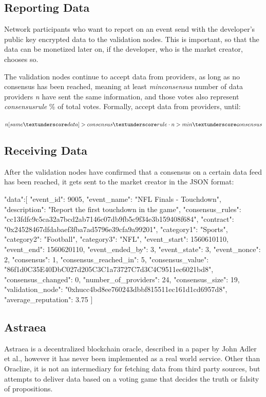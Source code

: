 \subsection*{Reporting Data}
Network participants who want to report on an event send with the developer's public key encrypted data to the validation nodes. This is important, so that the data can be monetized later on, if the developer, who is the market creator, chooses so.

The validation nodes continue to accept data from providers, as long as no consensus has been reached, meaning at least \emph{min\textunderscore consensus} number of data providers \emph{n} have sent the same information, and those votes also represent \emph{consensus\textunderscore rule} \% of total votes\cite{veritywhitepaper}. 
Formally, accept data from providers, until:
\\
\\
$n[same\textunderscore data] > consensus\textunderscore rule \cdot n > min\textunderscore consensus$

\subsection*{Receiving Data}
After the validation nodes have confirmed that a consensus on a certain data feed has been reached, it gets sent to the market creator in the JSON format\cite{veritywhitepaper}:

\begin{GenericCode}
{
  "data":[
    {
      "event_id": 9005,
      "event_name": "NFL Finals - Touchdown",
      "description": "Report the first touchdown in the game",
      "consensus_rules": "cc13fdfc9c5ca32a7bcd2ab7146c07db9fb5c9f34e3b159408f684",
      "contract": "0x24528467dfdabaef3fba7ad5796e39cfa9a99201",
      "category1": "Sports",
      "category2": "Football",
      "category3": "NFL",
      "event_start": 1560610110,
      "event_end": 1560620110,
      "event_ended_by": 3,
      "event_state": 3,
      "event_nonce": 2,
      "consensus": 1,
      "consensus_reached_in": 5,
      "consensus_value": "86f1d0C35E40DbC027d205C3C1a73727C7d3C4C9511ec6021bd8",
      "consensus_changed": 0,
      "number_of_providers": 24,
      "consensus_size": 19,
      "validation_node": "0xhucc4bd8ee760243dbbf815511ec161d1cd6957d8",
      "average_reputation": 3.75
    }
  ]
}
\end{GenericCode}

\subsection{Astraea}
Astraea is a decentralized blockchain oracle, described in a paper by John Adler et al.\cite{astraea}, however it has never been implemented as a real world service. Other than Oraclize, it is not an intermediary for fetching data from third party sources, but attempts to deliver data based on a voting game that decides the truth or falsity of propositions.

